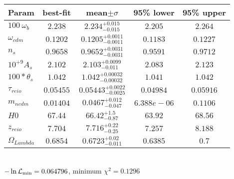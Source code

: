 \begin{tabular}{|l|c|c|c|c|} 
 \hline 
Param & best-fit & mean$\pm\sigma$ & 95\% lower & 95\% upper \\ \hline 
$100~\omega{}_{b }$ &$2.238$ & $2.234_{-0.015}^{+0.015}$ & $2.205$ & $2.264$ \\ 
$\omega{}_{cdm }$ &$0.1202$ & $0.1205_{-0.0011}^{+0.0011}$ & $0.1183$ & $0.1227$ \\ 
$n_{s }$ &$0.9658$ & $0.9652_{-0.0031}^{+0.0031}$ & $0.9591$ & $0.9712$ \\ 
$10^{+9}A_{s }$ &$2.102$ & $2.103_{-0.011}^{+0.0099}$ & $2.083$ & $2.123$ \\ 
$100*\theta{}_{s }$ &$1.042$ & $1.042_{-0.00032}^{+0.00032}$ & $1.041$ & $1.042$ \\ 
$\tau{}_{reio }$ &$0.05455$ & $0.05443_{-0.0025}^{+0.0022}$ & $0.04984$ & $0.05916$ \\ 
$m_{ncdm }$ &$0.01404$ & $0.0467_{-0.047}^{+0.012}$ & $6.388e-06$ & $0.1106$ \\ 
$H0$ &$67.44$ & $66.42_{-0.87}^{+1.5}$ & $63.92$ & $68.56$ \\ 
$z_{reio }$ &$7.704$ & $7.716_{-0.25}^{+0.22}$ & $7.257$ & $8.188$ \\ 
$\Omega{}_{Lambda }$ &$0.6854$ & $0.6723_{-0.011}^{+0.02}$ & $0.6385$ & $0.7$ \\ 
\hline 
 \end{tabular} \\ 
$-\ln{\cal L}_\mathrm{min} =0.064796$, minimum $\chi^2=0.1296$ \\ 
